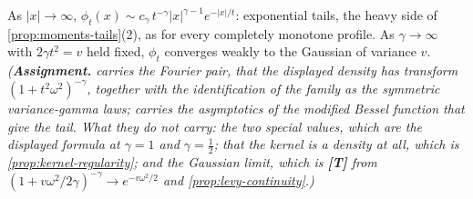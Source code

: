 \begin{proposition}
As $|x| \to \infty$,
$\phi_t(x) \sim c_\gamma\,t^{-\gamma}|x|^{\gamma-1}e^{-|x|/t}$: exponential tails, the
heavy side of \ref{prop:moments-tails}(2), as for every completely monotone profile. As
$\gamma \to \infty$ with $2\gamma t^2 = v$ held fixed, $\phi_t$ converges weakly to the
Gaussian of variance $v$.
\statusA\quad{}\quad{}\quad\emph{(\textbf{Assignment.}  carries
the Fourier pair, that the displayed density has transform $(1+t^2\omega^2)^{-\gamma}$, together
with the identification of the family as the symmetric variance-gamma laws;  carries
the asymptotics of the modified Bessel function that give the tail. What they do not carry: the
two special values, which are the displayed formula at $\gamma = 1$ and $\gamma = \tfrac12$;
that the kernel is a density at all, which is \ref{prop:kernel-regularity}; and the Gaussian
limit, which is \textbf{[T]} from $(1 + v\omega^2/2\gamma)^{-\gamma} \to e^{-v\omega^2/2}$ and
\ref{prop:levy-continuity}.)}
\end{proposition}

